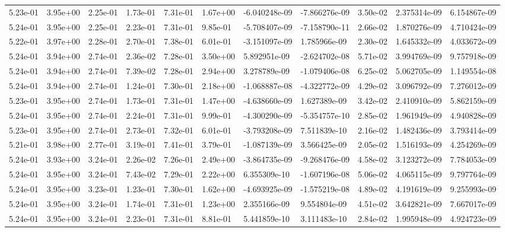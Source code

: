 \begin{longtable}{| p{} | p{} |}
5.23e-01 & 3.95e+00 & 2.25e-01 & 1.73e-01 & 7.31e-01 & 1.67e+00 & -6.040248e-09 & -7.866276e-09 &  3.50e-02 &  2.375314e-09 &  6.154867e-09 \\
5.24e-01 & 3.95e+00 & 2.25e-01 & 2.23e-01 & 7.31e-01 & 9.85e-01 & -5.708407e-09 & -7.158790e-11 &  2.66e-02 &  1.870276e-09 &  4.710424e-09 \\
5.22e-01 & 3.97e+00 & 2.28e-01 & 2.70e-01 & 7.38e-01 & 6.01e-01 & -3.151097e-09 &  1.785966e-09 &  2.30e-02 &  1.645332e-09 &  4.033672e-09 \\
5.24e-01 & 3.94e+00 & 2.74e-01 & 2.36e-02 & 7.28e-01 & 3.50e+00 &  5.892951e-09 & -2.624702e-08 &  5.71e-02 &  3.994769e-09 &  9.757918e-09 \\
5.24e-01 & 3.94e+00 & 2.74e-01 & 7.39e-02 & 7.28e-01 & 2.94e+00 &  3.278789e-09 & -1.079406e-08 &  6.25e-02 &  5.062705e-09 &  1.149554e-08 \\
5.24e-01 & 3.94e+00 & 2.74e-01 & 1.24e-01 & 7.30e-01 & 2.18e+00 & -1.068887e-08 & -4.322772e-09 &  4.29e-02 &  3.096792e-09 &  7.276012e-09 \\
5.23e-01 & 3.95e+00 & 2.74e-01 & 1.73e-01 & 7.31e-01 & 1.47e+00 & -4.638660e-09 &  1.627389e-09 &  3.42e-02 &  2.410910e-09 &  5.862159e-09 \\
5.24e-01 & 3.95e+00 & 2.74e-01 & 2.24e-01 & 7.31e-01 & 9.99e-01 & -4.300290e-09 & -5.354757e-10 &  2.85e-02 &  1.961949e-09 &  4.940828e-09 \\
5.23e-01 & 3.95e+00 & 2.74e-01 & 2.73e-01 & 7.32e-01 & 6.01e-01 & -3.793208e-09 &  7.511839e-10 &  2.16e-02 &  1.482436e-09 &  3.793414e-09 \\
5.21e-01 & 3.98e+00 & 2.77e-01 & 3.19e-01 & 7.41e-01 & 3.79e-01 & -1.087139e-09 &  3.566425e-09 &  2.05e-02 &  1.516193e-09 &  4.254269e-09 \\
5.24e-01 & 3.93e+00 & 3.24e-01 & 2.26e-02 & 7.26e-01 & 2.49e+00 & -3.864735e-09 & -9.268476e-09 &  4.58e-02 &  3.123272e-09 &  7.784053e-09 \\
5.24e-01 & 3.95e+00 & 3.24e-01 & 7.43e-02 & 7.29e-01 & 2.22e+00 &  6.355309e-10 & -1.607196e-08 &  5.06e-02 &  4.065115e-09 &  9.797764e-09 \\
5.24e-01 & 3.95e+00 & 3.23e-01 & 1.23e-01 & 7.30e-01 & 1.62e+00 & -4.693925e-09 & -1.575219e-08 &  4.89e-02 &  4.191619e-09 &  9.255993e-09 \\
5.24e-01 & 3.95e+00 & 3.24e-01 & 1.74e-01 & 7.31e-01 & 1.23e+00 &  2.355166e-09 &  9.554804e-09 &  4.51e-02 &  3.642821e-09 &  7.667017e-09 \\
5.24e-01 & 3.95e+00 & 3.24e-01 & 2.23e-01 & 7.31e-01 & 8.81e-01 &  5.441859e-10 &  3.111483e-10 &  2.84e-02 &  1.995948e-09 &  4.924723e-09 \\

\end{longtable}
